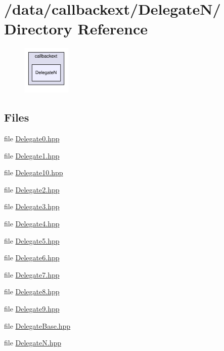 \hypertarget{dir_000003}{
\section{/data/callbackext/Delegate\-N/ Directory Reference}
\label{dir_000003}
}


\begin{figure}[H]
\begin{center}
\leavevmode
\includegraphics[width=65pt]{dir_000003_dep}
\end{center}
\end{figure}
\subsection*{Files}
\begin{CompactItemize}
\item 
file \hyperlink{Delegate0_8hpp}{Delegate0.hpp}
\item 
file \hyperlink{Delegate1_8hpp}{Delegate1.hpp}
\item 
file \hyperlink{Delegate10_8hpp}{Delegate10.hpp}
\item 
file \hyperlink{Delegate2_8hpp}{Delegate2.hpp}
\item 
file \hyperlink{Delegate3_8hpp}{Delegate3.hpp}
\item 
file \hyperlink{Delegate4_8hpp}{Delegate4.hpp}
\item 
file \hyperlink{Delegate5_8hpp}{Delegate5.hpp}
\item 
file \hyperlink{Delegate6_8hpp}{Delegate6.hpp}
\item 
file \hyperlink{Delegate7_8hpp}{Delegate7.hpp}
\item 
file \hyperlink{Delegate8_8hpp}{Delegate8.hpp}
\item 
file \hyperlink{Delegate9_8hpp}{Delegate9.hpp}
\item 
file \hyperlink{DelegateBase_8hpp}{Delegate\-Base.hpp}
\item 
file \hyperlink{DelegateN_8hpp}{Delegate\-N.hpp}
\end{CompactItemize}
